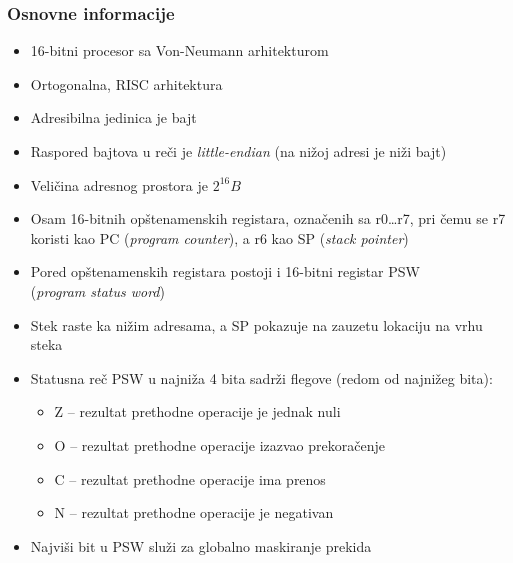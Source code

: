 \subsubsection{Osnovne informacije}
\begin{itemize}
    \item 16-bitni procesor sa Von-Neumann arhitekturom
    \item Ortogonalna, RISC arhitektura
    \item Adresibilna jedinica je bajt
    \item Raspored bajtova u reči je \textit{little-endian} (na nižoj adresi
          je niži bajt)
    \item Veličina adresnog prostora je $2^{16}B$
    \item Osam 16-bitnih opštenamenskih registara, označenih sa r0\ldots r7,
          pri čemu se r7 koristi kao PC (\textit{program counter}), a r6 kao SP
          (\textit{stack pointer})
    \item Pored opštenamenskih registara postoji i 16-bitni registar
          PSW\\ (\textit{program status word})
    \item Stek raste ka nižim adresama, a SP pokazuje na zauzetu lokaciju na
          vrhu steka
    \item Statusna reč PSW u najniža 4 bita sadrži flegove
          (redom od najnižeg bita):
          \begin{itemize}
              \item Z -- rezultat prethodne operacije je jednak nuli
              \item O -- rezultat prethodne operacije izazvao prekoračenje
              \item C -- rezultat prethodne operacije ima prenos
              \item N -- rezultat prethodne operacije je negativan
          \end{itemize}
    \item Najviši bit u PSW služi za globalno maskiranje prekida
\end{itemize}


